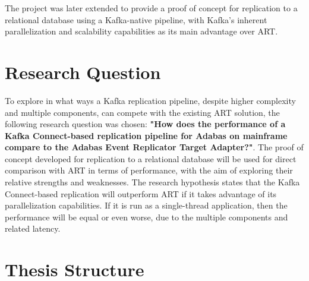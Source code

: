 The project was later extended to provide a proof of concept for replication to a relational database using a Kafka-native pipeline, with Kafka's inherent parallelization and scalability capabilities \cite{peddireddy2023kafkadatalakebenefits} as its main advantage over \ac{ART}.

\section{Research Question}
\label{ch01:intro:researchquestion}
To explore in what ways a Kafka replication pipeline, despite higher complexity and multiple components, can compete with the existing \ac{ART} solution, the following research question was chosen: \textbf{"How does the performance of a Kafka Connect-based replication pipeline for Adabas on mainframe compare to the Adabas Event Replicator Target Adapter?"}. The proof of concept developed for replication to a relational database will be used for direct comparison with \ac{ART} in terms of performance, with the aim of exploring their relative strengths and weaknesses. The research hypothesis states that the Kafka Connect-based replication will outperform \ac{ART} if it takes advantage of its parallelization capabilities. If it is run as a single-thread application, then the performance will be equal or even worse, due to the multiple components and related latency.

\section{Thesis Structure}
\label{ch01:intro:thesisstructure}